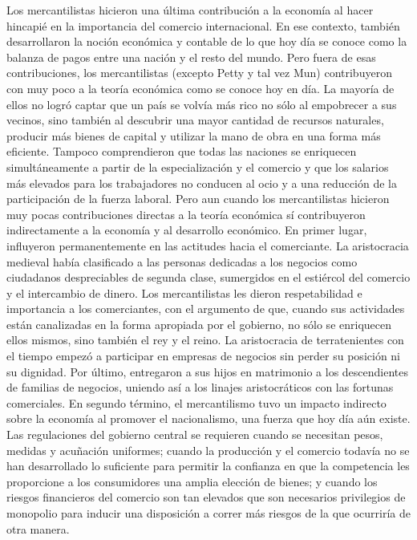 \documentclass[
  stu,
  floatsintext,
  longtable,
  a4paper,
  nolmodern,
  notxfonts,
  notimes,
  12pt,
  colorlinks=true,linkcolor=blue,citecolor=blue,urlcolor=blue]{apa7}
\begin{document}
Los mercantilistas hicieron una última contribución a la economía al
hacer hincapié en la importancia del comercio internacional. En ese
contexto, también desarrollaron la noción económica y contable de lo que
hoy día se conoce como la balanza de pagos entre una nación y el resto
del mundo. Pero fuera de esas contribuciones, los mercantilistas
(excepto Petty y tal vez Mun) contribuyeron con muy poco a la teoría
económica como se conoce hoy en día. La mayoría de ellos no logró captar
que un país se volvía más rico no sólo al empobrecer a sus vecinos, sino
también al descubrir una mayor cantidad de recursos naturales, producir
más bienes de capital y utilizar la mano de obra en una forma más
eficiente. Tampoco comprendieron que todas las naciones se enriquecen
simultáneamente a partir de la especialización y el comercio y que los
salarios más elevados para los trabajadores no conducen al ocio y a una
reducción de la participación de la fuerza laboral. Pero aun cuando los
mercantilistas hicieron muy pocas contribuciones directas a la teoría
económica sí contribuyeron indirectamente a la economía y al desarrollo
económico. En primer lugar, influyeron permanentemente en las actitudes
hacia el comerciante. La aristocracia medieval había clasificado a las
personas dedicadas a los negocios como ciudadanos despreciables de
segunda clase, sumergidos en el estiércol del comercio y el intercambio
de dinero. Los mercantilistas les dieron respetabilidad e importancia a
los comerciantes, con el argumento de que, cuando sus actividades están
canalizadas en la forma apropiada por el gobierno, no sólo se enriquecen
ellos mismos, sino también el rey y el reino. La aristocracia de
terratenientes con el tiempo empezó a participar en empresas de negocios
sin perder su posición ni su dignidad. Por último, entregaron a sus
hijos en matrimonio a los descendientes de familias de negocios, uniendo
así a los linajes aristocráticos con las fortunas comerciales. En
segundo término, el mercantilismo tuvo un impacto indirecto sobre la
economía al promover el nacionalismo, una fuerza que hoy día aún existe.
Las regulaciones del gobierno central se requieren cuando se necesitan
pesos, medidas y acuñación uniformes; cuando la producción y el comercio
todavía no se han desarrollado lo suficiente para permitir la confianza
en que la competencia les proporcione a los consumidores una amplia
elección de bienes; y cuando los riesgos financieros del comercio son
tan elevados que son necesarios privilegios de monopolio para inducir
una disposición a correr más riesgos de la que ocurriría de otra manera.
\end{document}
